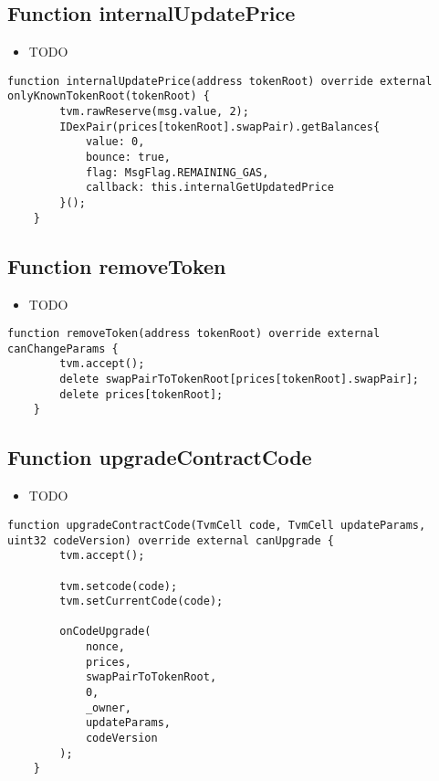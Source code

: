 \subsection{Function internalUpdatePrice}

\noindent\begin{itemize}
\item TODO
\end{itemize}

\begin{lstlisting}[firstnumber=133]
    function internalUpdatePrice(address tokenRoot) override external onlyKnownTokenRoot(tokenRoot) {
        tvm.rawReserve(msg.value, 2);
        IDexPair(prices[tokenRoot].swapPair).getBalances{
            value: 0, 
            bounce: true, 
            flag: MsgFlag.REMAINING_GAS,
            callback: this.internalGetUpdatedPrice
        }();
    }
\end{lstlisting}

\subsection{Function removeToken}

\noindent\begin{itemize}
\item TODO
\end{itemize}

\begin{lstlisting}[firstnumber=189]
    function removeToken(address tokenRoot) override external canChangeParams {
        tvm.accept();
        delete swapPairToTokenRoot[prices[tokenRoot].swapPair];
        delete prices[tokenRoot];
    }
\end{lstlisting}

\subsection{Function upgradeContractCode}

\noindent\begin{itemize}
\item TODO
\end{itemize}

\begin{lstlisting}[firstnumber=62]
    function upgradeContractCode(TvmCell code, TvmCell updateParams, uint32 codeVersion) override external canUpgrade {
        tvm.accept();

        tvm.setcode(code);
        tvm.setCurrentCode(code);

        onCodeUpgrade(
            nonce,
            prices,
            swapPairToTokenRoot,
            0,
            _owner,
            updateParams,
            codeVersion
        );
    }
\end{lstlisting}

